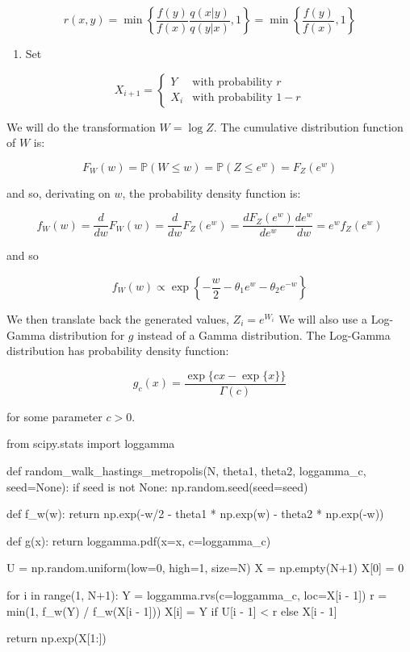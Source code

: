 \[ r(x, y) = \min \left\{ \frac{f(y)}{f(x)} \frac{q(x | y)}{q(y | x)}, 1 \right\} = \min \left\{ \frac{f(y)}{f(x)}, 1 \right\} \]

\begin{enumerate}[tightlist,label={\arabic*.},resume]
\item
  Set
\end{enumerate}

\[
X_{i+1} = \begin{cases}
Y   &\text{with probability } r \\
X_i &\text{with probability } 1 - r 
\end{cases}
\]

We will do the transformation \(W = \log Z\). The cumulative
distribution function of \(W\) is:

\[ F_{W}(w) = \mathbb{P}\left( W \leq w \right) = \mathbb{P}\left( Z \leq e^{w} \right) = F_Z(e^{w}) \]

and so, derivating on \(w\), the probability density function is:

\[ f_W(w) = \frac{d}{dw} F_{W}(w) = \frac{d}{dw} F_Z(e^{w}) = \frac{d F_Z(e^{w})}{d e^{w}} \frac{d e^{w}}{ dw } = e^{w} f_Z(e^w) \]

and so

\[ f_W(w) \propto \exp \left\{ -\frac{w}{2}
-\theta_1 e^{w} - \theta_2 e^{-w} \right\} \]

We then translate back the generated values, \(Z_i = e^{W_i}\) We will
also use a Log-Gamma distribution for \(g\) instead of a Gamma
distribution. The Log-Gamma distribution has probability density
function:

\[ g_c(x) = \frac{\exp \{ cx - \exp \{ x \} \}}{\Gamma(c)} \]

for some parameter \(c > 0\).

\begin{python}
from scipy.stats import loggamma

def random_walk_hastings_metropolis(N, theta1, theta2, loggamma_c, seed=None):
    if seed is not None:
        np.random.seed(seed=seed)
        
    def f_w(w):
        return np.exp(-w/2 - theta1 * np.exp(w) - theta2 * np.exp(-w))
        
    def g(x):
        return loggamma.pdf(x=x, c=loggamma_c)
    
    U = np.random.uniform(low=0, high=1, size=N)
    X = np.empty(N+1)
    X[0] = 0
    
    for i in range(1, N+1):
        Y = loggamma.rvs(c=loggamma_c, loc=X[i - 1])
        r = min(1, f_w(Y) / f_w(X[i - 1]))
        X[i] = Y if U[i - 1] < r else X[i - 1]
        
    return np.exp(X[1:])
\end{python}

